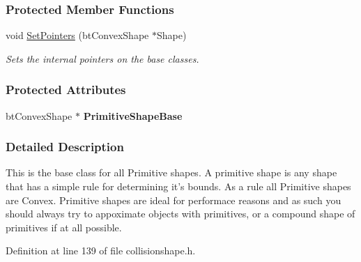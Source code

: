 \subsubsection*{Protected Member Functions}
\begin{DoxyCompactItemize}
\item 
\hypertarget{classphys_1_1PrimitiveCollisionShape_a88d159f7d9966b0d82797af73fd4123f}{
void \hyperlink{classphys_1_1PrimitiveCollisionShape_a88d159f7d9966b0d82797af73fd4123f}{SetPointers} (btConvexShape $\ast$Shape)}
\label{classphys_1_1PrimitiveCollisionShape_a88d159f7d9966b0d82797af73fd4123f}

\begin{DoxyCompactList}\small\item\em Sets the internal pointers on the base classes. \item\end{DoxyCompactList}\end{DoxyCompactItemize}
\subsubsection*{Protected Attributes}
\begin{DoxyCompactItemize}
\item 
\hypertarget{classphys_1_1PrimitiveCollisionShape_aa0119a3525d48477100a080ceb26258b}{
btConvexShape $\ast$ {\bfseries PrimitiveShapeBase}}
\label{classphys_1_1PrimitiveCollisionShape_aa0119a3525d48477100a080ceb26258b}

\end{DoxyCompactItemize}


\subsubsection{Detailed Description}
This is the base class for all Primitive shapes. A primitive shape is any shape that has a simple rule for determining it's bounds. As a rule all Primitive shapes are Convex. Primitive shapes are ideal for performace reasons and as such you should always try to appoximate objects with primitives, or a compound shape of primitives if at all possible. 

Definition at line 139 of file collisionshape.h.



